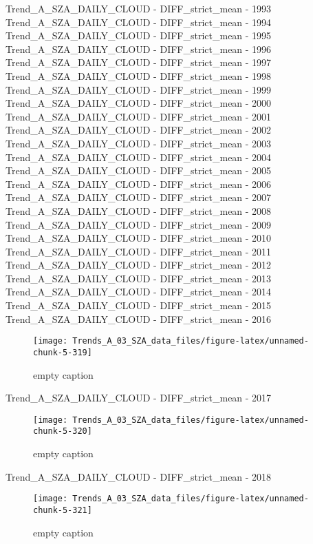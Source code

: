 \documentclass[
  10pt,
  a4paper,oneside]{article}
\begin{document}
Trend\_A\_SZA\_DAILY\_CLOUD - DIFF\_strict\_mean - 1993
Trend\_A\_SZA\_DAILY\_CLOUD - DIFF\_strict\_mean - 1994
Trend\_A\_SZA\_DAILY\_CLOUD - DIFF\_strict\_mean - 1995
Trend\_A\_SZA\_DAILY\_CLOUD - DIFF\_strict\_mean - 1996
Trend\_A\_SZA\_DAILY\_CLOUD - DIFF\_strict\_mean - 1997
Trend\_A\_SZA\_DAILY\_CLOUD - DIFF\_strict\_mean - 1998
Trend\_A\_SZA\_DAILY\_CLOUD - DIFF\_strict\_mean - 1999
Trend\_A\_SZA\_DAILY\_CLOUD - DIFF\_strict\_mean - 2000
Trend\_A\_SZA\_DAILY\_CLOUD - DIFF\_strict\_mean - 2001
Trend\_A\_SZA\_DAILY\_CLOUD - DIFF\_strict\_mean - 2002
Trend\_A\_SZA\_DAILY\_CLOUD - DIFF\_strict\_mean - 2003
Trend\_A\_SZA\_DAILY\_CLOUD - DIFF\_strict\_mean - 2004
Trend\_A\_SZA\_DAILY\_CLOUD - DIFF\_strict\_mean - 2005
Trend\_A\_SZA\_DAILY\_CLOUD - DIFF\_strict\_mean - 2006
Trend\_A\_SZA\_DAILY\_CLOUD - DIFF\_strict\_mean - 2007
Trend\_A\_SZA\_DAILY\_CLOUD - DIFF\_strict\_mean - 2008
Trend\_A\_SZA\_DAILY\_CLOUD - DIFF\_strict\_mean - 2009
Trend\_A\_SZA\_DAILY\_CLOUD - DIFF\_strict\_mean - 2010
Trend\_A\_SZA\_DAILY\_CLOUD - DIFF\_strict\_mean - 2011
Trend\_A\_SZA\_DAILY\_CLOUD - DIFF\_strict\_mean - 2012
Trend\_A\_SZA\_DAILY\_CLOUD - DIFF\_strict\_mean - 2013
Trend\_A\_SZA\_DAILY\_CLOUD - DIFF\_strict\_mean - 2014
Trend\_A\_SZA\_DAILY\_CLOUD - DIFF\_strict\_mean - 2015
Trend\_A\_SZA\_DAILY\_CLOUD - DIFF\_strict\_mean - 2016

\begin{figure}[!ht]

{\centering \texttt{[image: Trends\_A\_03\_SZA\_data\_files/figure-latex/unnamed-chunk-5-319]} 

}

\caption{ empty caption }\label{fig:unnamed-chunk-5-319}
\end{figure}

Trend\_A\_SZA\_DAILY\_CLOUD - DIFF\_strict\_mean - 2017

\begin{figure}[!ht]

{\centering \texttt{[image: Trends\_A\_03\_SZA\_data\_files/figure-latex/unnamed-chunk-5-320]} 

}

\caption{ empty caption }\label{fig:unnamed-chunk-5-320}
\end{figure}

Trend\_A\_SZA\_DAILY\_CLOUD - DIFF\_strict\_mean - 2018

\begin{figure}[!ht]

{\centering \texttt{[image: Trends\_A\_03\_SZA\_data\_files/figure-latex/unnamed-chunk-5-321]} 

}

\caption{ empty caption }\label{fig:unnamed-chunk-5-321}
\end{figure}
\end{document}
